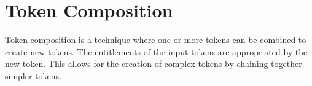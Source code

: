 \section{Token Composition}\label{sec:token-composition}

Token composition is a technique where one or more tokens can be
combined to create new tokens.  The entitlements of the input tokens
are appropriated by the new token.  This allows for the creation of
complex tokens by chaining together simpler tokens.
